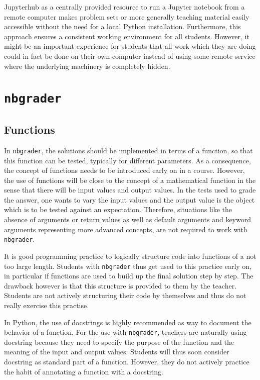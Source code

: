 \documentclass[twocolumn]{svjour3}          %
\begin{document}
Jupyterhub as a centrally provided resource to run a Jupyter notebook from a
remote computer makes problem sets or more generally teaching material easily
accessible without the need for a local Python installation. Furthermore, this
approach ensures a consistent working environment for all students. However,
it might be an important experience for students that all work which they
are doing could in fact be done on their own computer instead of using some
remote service where the underlying machinery is completely hidden.

\section{\texttt{nbgrader}}

\subsection{Functions}

In \texttt{nbgrader}, the solutions should be implemented in terms of a
function, so that this function can be tested, typically for different
parameters. As a consequence, the concept of functions needs to be introduced
early on in a course. However, the use of functions will be close to the
concept of a mathematical function in the sense that there will be input values
and output values. In the tests used to grade the answer, one wants to vary the
input values and the output value is the object which is to be tested against
an expectation. Therefore, situations like the absence of arguments or return
values as well as default arguments and keyword arguments representing more
advanced concepts, are not required to work with \texttt{nbgrader}.

It is good programming practice to logically structure code into functions of a
not too large length. Students with \texttt{nbgrader} thus get used to this
practice early on, in particular if functions are used to build up the final
solution step by step. The drawback however is that this structure is provided
to them by the teacher. Students are not actively structuring their code by
themselves and thus do not really exercise this practise.

In Python, the use of docstrings is highly recommended as way to document
the behavior of a function. For the use with \texttt{nbgrader}, teachers are
naturally using docstring because they need to specify the purpose of the
function and the meaning of the input and output values. Students will thus
soon consider docstring as standard part of a function. However, they do not
actively practice the habit of annotating a function with a docstring.
\end{document}
